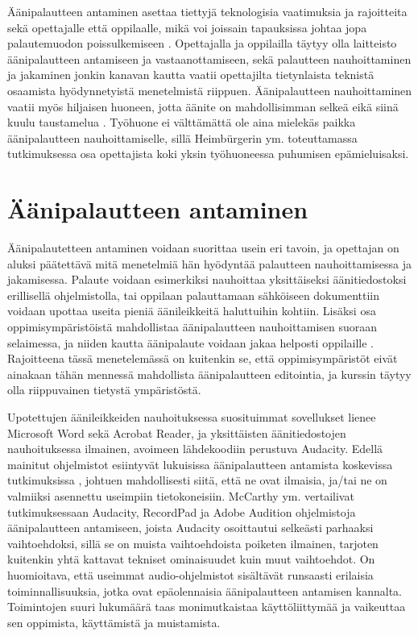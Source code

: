 \documentclass[utf8]{gradu3}
\begin{document}
Äänipalautteen antaminen asettaa tiettyjä teknologisia vaatimuksia ja rajoitteita sekä opettajalle että oppilaalle, mikä voi joissain tapauksissa johtaa jopa palautemuodon poissulkemiseen \parencite{developing}. Opettajalla ja oppilailla täytyy olla laitteisto äänipalautteen antamiseen ja vastaanottamiseen, sekä palautteen nauhoittaminen ja jakaminen jonkin kanavan kautta vaatii opettajilta tietynlaista teknistä osaamista hyödynnetyistä menetelmistä riippuen. Äänipalautteen nauhoittaminen vaatii myös hiljaisen huoneen, jotta äänite on mahdollisimman selkeä eikä siinä kuulu taustamelua \parencite{developing}. Työhuone ei välttämättä ole aina mielekäs paikka äänipalautteen nauhoittamiselle, sillä Heimbürgerin ym. \parencite*{academics} toteuttamassa tutkimuksessa osa opettajista koki yksin työhuoneessa puhumisen epämieluisaksi.

\section{Äänipalautteen antaminen}

Äänipalautetteen antaminen voidaan suorittaa usein eri tavoin, ja opettajan on aluksi päätettävä mitä menetelmiä hän hyödyntää palautteen nauhoittamisessa ja jakamisessa. Palaute voidaan esimerkiksi nauhoittaa yksittäiseksi äänitiedostoksi erillisellä ohjelmistolla, tai oppilaan palauttamaan sähköiseen dokumenttiin voidaan upottaa useita pieniä äänileikkeitä haluttuihin kohtiin. Lisäksi osa oppimisympäristöistä mahdollistaa äänipalautteen nauhoittamisen suoraan selaimessa, ja niiden kautta äänipalaute voidaan jakaa helposti oppilaille \parencite{using}. Rajoitteena tässä menetelemässä on kuitenkin se, että oppimisympäristöt eivät ainakaan tähän mennessä mahdollista äänipalautteen editointia, ja kurssin täytyy olla riippuvainen tietystä ympäristöstä.

Upotettujen äänileikkeiden nauhoituksessa suosituimmat sovellukset lienee Microsoft Word sekä Acrobat Reader, ja yksittäisten äänitiedostojen nauhoituksessa ilmainen, avoimeen lähdekoodiin perustuva Audacity. Edellä mainitut ohjelmistot esiintyvät lukuisissa äänipalautteen antamista koskevissa tutkimuksissa \parencite{using, ice, principles, evaluating, areYouListening, engaging, academics, attitudes, versus}, johtuen mahdollisesti siitä, että ne ovat ilmaisia, ja/tai ne on valmiiksi asennettu useimpiin tietokoneisiin. McCarthy ym. \parencite*{evaluating} vertailivat tutkimuksessaan Audacity, RecordPad ja Adobe Audition ohjelmistoja äänipalautteen antamiseen, joista Audacity osoittautui selkeästi parhaaksi vaihtoehdoksi, sillä se on muista vaihtoehdoista poiketen ilmainen, tarjoten kuitenkin yhtä kattavat tekniset ominaisuudet kuin muut vaihtoehdot. On huomioitava, että useimmat audio-ohjelmistot sisältävät runsaasti erilaisia toiminnallisuuksia, jotka ovat epäolennaisia äänipalautteen antamisen kannalta. Toimintojen suuri lukumäärä taas monimutkaistaa käyttöliittymää ja vaikeuttaa sen oppimista, käyttämistä ja muistamista.
\end{document}
